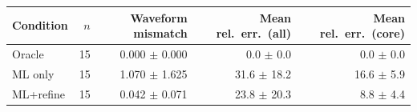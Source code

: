 \begin{tabular}{lrrrr}
\toprule
Condition & $n$ & Waveform mismatch & Mean rel.\ err.\ (all) & Mean rel.\ err.\ (core) \\
\midrule
Oracle & 15 & 0.000 $\pm$ 0.000 & 0.0 $\pm$ 0.0 & 0.0 $\pm$ 0.0 \\
ML only & 15 & 1.070 $\pm$ 1.625 & 31.6 $\pm$ 18.2 & 16.6 $\pm$ 5.9 \\
ML+refine & 15 & 0.042 $\pm$ 0.071 & 23.8 $\pm$ 20.3 & 8.8 $\pm$ 4.4 \\
\bottomrule
\end{tabular}